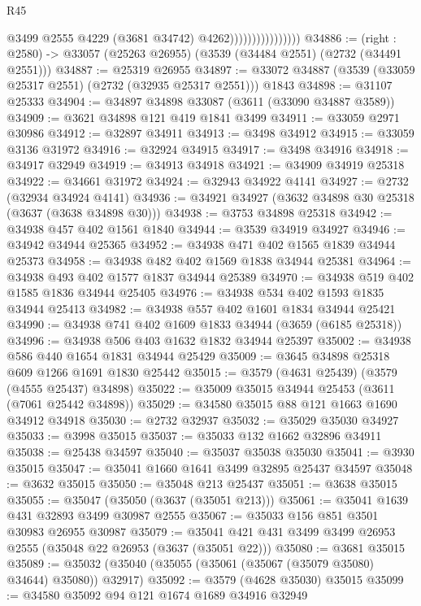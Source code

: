 \begin{lexlean}{R45}
\begin{coremodule}
                                    @3499
                                    @2555
                                    @4229
                                    (@3681 @34742)
                                    @4262))))))))))))))))
@34886 := (right : @2580) -> @33057 (@25263 @26955) (@3539 (@34484 @2551) (@2732 (@34491 @2551)))
@34887 := @25319 @26955
@34897 := @33072 @34887 (@3539 (@33059 @25317 @2551) (@2732 (@32935 @25317 @2551))) @1843
@34898 := @31107 @25333
@34904 := @34897 @34898 @33087 (@3611 (@33090 @34887 @3589))
@34909 := @3621 @34898 @121 @419 @1841 @3499
@34911 := @33059 @2971 @30986
@34912 := @32897 @34911
@34913 := @3498 @34912
@34915 := @33059 @3136 @31972
@34916 := @32924 @34915
@34917 := @3498 @34916
@34918 := @34917 @32949
@34919 := @34913 @34918
@34921 := @34909 @34919 @25318
@34922 := @34661 @31972
@34924 := @32943 @34922 @4141
@34927 := @2732 (@32934 @34924 @4141)
@34936 := @34921 @34927 (@3632 @34898 @30 @25318 (@3637 (@3638 @34898 @30)))
@34938 := @3753 @34898 @25318
@34942 := @34938 @457 @402 @1561 @1840
@34944 := @3539 @34919 @34927
@34946 := @34942 @34944 @25365
@34952 := @34938 @471 @402 @1565 @1839 @34944 @25373
@34958 := @34938 @482 @402 @1569 @1838 @34944 @25381
@34964 := @34938 @493 @402 @1577 @1837 @34944 @25389
@34970 := @34938 @519 @402 @1585 @1836 @34944 @25405
@34976 := @34938 @534 @402 @1593 @1835 @34944 @25413
@34982 := @34938 @557 @402 @1601 @1834 @34944 @25421
@34990 := @34938 @741 @402 @1609 @1833 @34944 (@3659 (@6185 @25318))
@34996 := @34938 @506 @403 @1632 @1832 @34944 @25397
@35002 := @34938 @586 @440 @1654 @1831 @34944 @25429
@35009 := @3645 @34898 @25318 @609 @1266 @1691 @1830 @25442
@35015 := @3579 (@4631 @25439) (@3579 (@4555 @25437) @34898)
@35022 := @35009 @35015 @34944 @25453 (@3611 (@7061 @25442 @34898))
@35029 := @34580 @35015 @88 @121 @1663 @1690 @34912 @34918
@35030 := @2732 @32937
@35032 := @35029 @35030 @34927
@35033 := @3998 @35015
@35037 := @35033 @132 @1662 @32896 @34911
@35038 := @25438 @34597
@35040 := @35037 @35038 @35030
@35041 := @3930 @35015
@35047 := @35041 @1660 @1641 @3499 @32895 @25437 @34597
@35048 := @3632 @35015
@35050 := @35048 @213 @25437
@35051 := @3638 @35015
@35055 := @35047 (@35050 (@3637 (@35051 @213)))
@35061 := @35041 @1639 @431 @32893 @3499 @30987 @2555
@35067 := @35033 @156 @851 @3501 @30983 @26955 @30987
@35079 := @35041 @421 @431 @3499 @3499 @26953 @2555 (@35048 @22 @26953 (@3637 (@35051 @22)))
@35080 := @3681 @35015
@35089 := @35032 (@35040 (@35055 (@35061 (@35067 (@35079 @35080) @34644) @35080)) @32917)
@35092 := @3579 (@4628 @35030) @35015
@35099 := @34580 @35092 @94 @121 @1674 @1689 @34916 @32949

\end{coremodule}
\end{lexlean}
